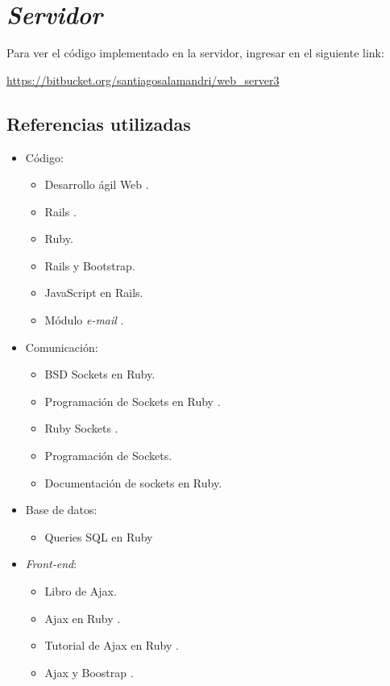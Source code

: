 \section{{\emph{Servidor}}}
Para ver el código implementado en la servidor, ingresar en el siguiente link:

\href{url}{https://bitbucket.org/santiagosalamandri/web\_server3}
\subsection{Referencias utilizadas}
\begin{itemize}
\item Código:
\begin{itemize}
\item Desarrollo ágil Web \cite{rails1Book}.
\item Rails \cite{rails2Book}.
\item Ruby\cite{ruby1Book}.
\item Rails y Bootstrap\cite{rails1}.
\item JavaScript en Rails\cite{rails2}.
\item Módulo \textit{e-mail} \cite{rails3}.
\end{itemize}
		
\item Comunicación:
\begin{itemize}
\item BSD Sockets en Ruby\cite{socket2}.
\item Programación de Sockets en Ruby  \cite{socket3}.
\item Ruby Sockets \cite{socket4}.
\item Programación de Sockets\cite{socket5}.
\item Documentación de sockets en Ruby\cite{socket10}.
\end{itemize}
\item Base de datos:
	\begin{itemize}
	\item Queries SQL en Ruby\cite{sql1}
	\end{itemize}
\item \textit{Front-end}:
	\begin{itemize}
	\item Libro de Ajax\cite{ajax1Book}.
	\item Ajax en Ruby \cite{ajax1}.
	\item Tutorial de Ajax en Ruby \cite{ajax2}.
	\item Ajax y Boostrap \cite{ajax3}.
	\end{itemize}
\end{itemize}


